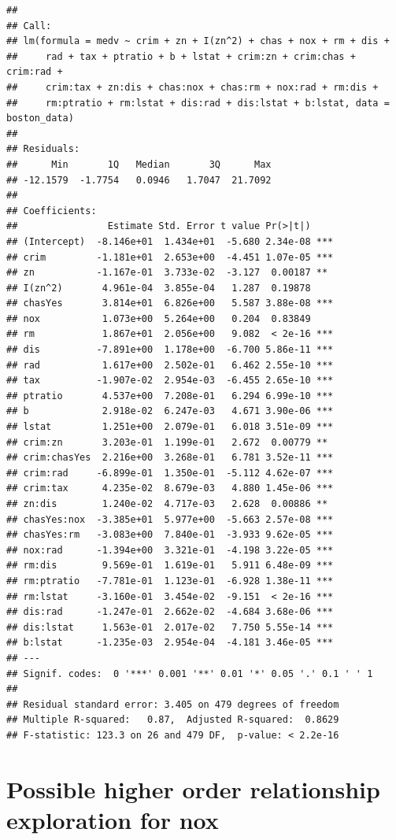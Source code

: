 \documentclass[
]{article}
\begin{document}
\begin{verbatim}
## 
## Call:
## lm(formula = medv ~ crim + zn + I(zn^2) + chas + nox + rm + dis + 
##     rad + tax + ptratio + b + lstat + crim:zn + crim:chas + crim:rad + 
##     crim:tax + zn:dis + chas:nox + chas:rm + nox:rad + rm:dis + 
##     rm:ptratio + rm:lstat + dis:rad + dis:lstat + b:lstat, data = boston_data)
## 
## Residuals:
##      Min       1Q   Median       3Q      Max 
## -12.1579  -1.7754   0.0946   1.7047  21.7092 
## 
## Coefficients:
##                Estimate Std. Error t value Pr(>|t|)    
## (Intercept)  -8.146e+01  1.434e+01  -5.680 2.34e-08 ***
## crim         -1.181e+01  2.653e+00  -4.451 1.07e-05 ***
## zn           -1.167e-01  3.733e-02  -3.127  0.00187 ** 
## I(zn^2)       4.961e-04  3.855e-04   1.287  0.19878    
## chasYes       3.814e+01  6.826e+00   5.587 3.88e-08 ***
## nox           1.073e+00  5.264e+00   0.204  0.83849    
## rm            1.867e+01  2.056e+00   9.082  < 2e-16 ***
## dis          -7.891e+00  1.178e+00  -6.700 5.86e-11 ***
## rad           1.617e+00  2.502e-01   6.462 2.55e-10 ***
## tax          -1.907e-02  2.954e-03  -6.455 2.65e-10 ***
## ptratio       4.537e+00  7.208e-01   6.294 6.99e-10 ***
## b             2.918e-02  6.247e-03   4.671 3.90e-06 ***
## lstat         1.251e+00  2.079e-01   6.018 3.51e-09 ***
## crim:zn       3.203e-01  1.199e-01   2.672  0.00779 ** 
## crim:chasYes  2.216e+00  3.268e-01   6.781 3.52e-11 ***
## crim:rad     -6.899e-01  1.350e-01  -5.112 4.62e-07 ***
## crim:tax      4.235e-02  8.679e-03   4.880 1.45e-06 ***
## zn:dis        1.240e-02  4.717e-03   2.628  0.00886 ** 
## chasYes:nox  -3.385e+01  5.977e+00  -5.663 2.57e-08 ***
## chasYes:rm   -3.083e+00  7.840e-01  -3.933 9.62e-05 ***
## nox:rad      -1.394e+00  3.321e-01  -4.198 3.22e-05 ***
## rm:dis        9.569e-01  1.619e-01   5.911 6.48e-09 ***
## rm:ptratio   -7.781e-01  1.123e-01  -6.928 1.38e-11 ***
## rm:lstat     -3.160e-01  3.454e-02  -9.151  < 2e-16 ***
## dis:rad      -1.247e-01  2.662e-02  -4.684 3.68e-06 ***
## dis:lstat     1.563e-01  2.017e-02   7.750 5.55e-14 ***
## b:lstat      -1.235e-03  2.954e-04  -4.181 3.46e-05 ***
## ---
## Signif. codes:  0 '***' 0.001 '**' 0.01 '*' 0.05 '.' 0.1 ' ' 1
## 
## Residual standard error: 3.405 on 479 degrees of freedom
## Multiple R-squared:   0.87,  Adjusted R-squared:  0.8629 
## F-statistic: 123.3 on 26 and 479 DF,  p-value: < 2.2e-16
\end{verbatim}

\section{Possible higher order relationship exploration for
nox}\label{possible-higher-order-relationship-exploration-for-nox}
\end{document}
